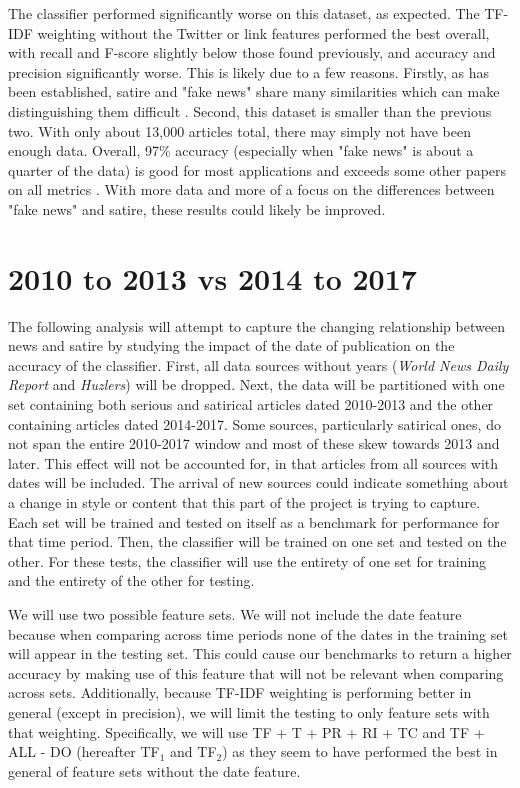 \documentclass [12 pt] {report}
\begin{document}
The classifier performed significantly worse on this dataset, as expected. The TF-IDF weighting without the Twitter or link features performed the best overall, with recall and F-score slightly below those found previously, and accuracy and precision significantly worse. This is likely due to a few reasons. Firstly, as has been established, satire and "fake news" share many similarities which can make distinguishing them difficult \cite{Horne}. Second, this dataset is smaller than the previous two. With only about 13,000 articles total, there may simply not have been enough data. Overall, 97\% accuracy (especially when "fake news" is about a quarter of the data) is good for most applications and exceeds some other papers on all metrics \cite{Burfoot}. With more data and more of a focus on the differences between "fake news" and satire, these results could likely be improved.

\section{2010 to 2013 vs 2014 to 2017}
The following analysis will attempt to capture the changing relationship between news and satire by studying the impact of the date of publication on the accuracy of the classifier. First, all data sources without years (\textit{World News Daily Report} and \textit{Huzlers}) will be dropped. Next, the data will be partitioned with one set containing both serious and satirical articles dated 2010-2013 and the other containing articles dated 2014-2017. Some sources, particularly satirical ones, do not span the entire 2010-2017 window and most of these skew towards 2013 and later. This effect will not be accounted for, in that articles from all sources with dates will be included. The arrival of new sources could indicate something about a change in style or content that this part of the project is trying to capture. Each set will be trained and tested on itself as a benchmark for performance for that time period. Then, the classifier will be trained on one set and tested on the other. For these tests, the classifier will use the entirety of one set for training and the entirety of the other for testing.

We will use two possible feature sets. We will not include the date feature because when comparing across time periods none of the dates in the training set will appear in the testing set. This could cause our benchmarks to return a higher accuracy by making use of this feature that will not be relevant when comparing across sets. Additionally, because TF-IDF weighting is performing better in general (except in precision), we will limit the testing to only feature sets with that weighting. Specifically, we will use TF + T + PR + RI + TC and TF + ALL - DO (hereafter TF$_1$ and TF$_2$) as they seem to have performed the best in general of feature sets without the date feature.
\end{document}
